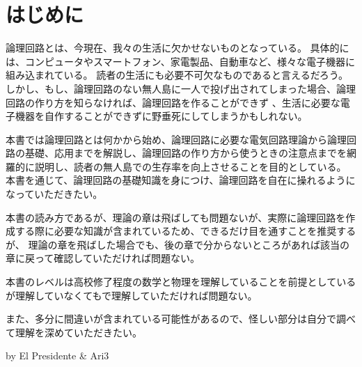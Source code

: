 \chapter{はじめに}
論理回路とは、今現在、我々の生活に欠かせないものとなっている。
具体的には、コンピュータやスマートフォン、家電製品、自動車など、様々な電子機器に組み込まれている。
読者の生活にも必要不可欠なものであると言えるだろう。
しかし、もし、論理回路のない無人島に一人で投げ出されてしまった場合、論理回路の作り方を知らなければ、論理回路を作ることができず
、生活に必要な電子機器を自作することができずに野垂死にしてしまうかもしれない。

本書では論理回路とは何かから始め、論理回路に必要な電気回路理論から論理回路の基礎、応用までを解説し、論理回路の作り方から使うときの注意点までを網羅的に説明し、読者の無人島での生存率を向上させることを目的としている。
本書を通じて、論理回路の基礎知識を身につけ、論理回路を自在に操れるようになっていただきたい。

本書の読み方であるが、理論の章は飛ばしても問題ないが、実際に論理回路を作成する際に必要な知識が含まれているため、できるだけ目を通すことを推奨するが、
理論の章を飛ばした場合でも、後の章で分からないところがあれば該当の章に戻って確認していただければ問題ない。

本書のレベルは高校修了程度の数学と物理を理解していることを前提としているが理解していなくてもで理解していただければ問題ない。

また、多分に間違いが含まれている可能性があるので、怪しい部分は自分で調べて理解を深めていただきたい。

by \quad El Presidente \quad \& \quad Ari3
